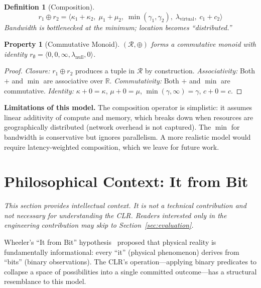 \documentclass[conference, 10pt, twocolumn]{IEEEtran}
\newtheorem{definition}{Definition}
\newtheorem{property}{Property}
\begin{document}
\begin{definition}[Composition]
\begin{equation}
r_1 \oplus r_2 = \langle \kappa_1 + \kappa_2, \; \mu_1 + \mu_2, \;
\min(\gamma_1, \gamma_2), \; \lambda_\text{virtual}, \; c_1 + c_2
\rangle
\end{equation}
Bandwidth is bottlenecked at the minimum; location becomes
``distributed.''
\end{definition}

\begin{property}[Commutative Monoid]
$(\mathcal{R}, \oplus)$ forms a commutative monoid with identity
$r_\emptyset = \langle 0, 0, \infty, \lambda_\text{null}, 0 \rangle$.
\end{property}

\begin{proof}
\emph{Closure:} $r_1 \oplus r_2$ produces a tuple in $\mathcal{R}$ by
construction.
\emph{Associativity:} Both $+$ and $\min$ are associative over
$\mathbb{R}$.
\emph{Commutativity:} Both $+$ and $\min$ are commutative.
\emph{Identity:} $\kappa + 0 = \kappa$, $\mu + 0 = \mu$,
$\min(\gamma, \infty) = \gamma$, $c + 0 = c$.
\end{proof}

\textbf{Limitations of this model.}  The composition operator is
simplistic: it assumes linear additivity of compute and memory, which
breaks down when resources are geographically distributed (network
overhead is not captured).  The $\min$ for bandwidth is conservative
but ignores parallelism.  A more realistic model would require
latency-weighted composition, which we leave for future work.

\section{Philosophical Context: It from Bit}
\label{sec:motivation}

\emph{This section provides intellectual context.  It is not a
technical contribution and not necessary for understanding the CLR.
Readers interested only in the engineering contribution may skip to
Section~\ref{sec:evaluation}.}

Wheeler's ``It from Bit'' hypothesis~\cite{wheeler1989information}
proposed that physical reality is fundamentally informational: every
``it'' (physical phenomenon) derives from ``bits'' (binary
observations).  The CLR's operation---applying binary predicates to
collapse a space of possibilities into a single committed
outcome---has a structural resemblance to this model.
\end{document}

